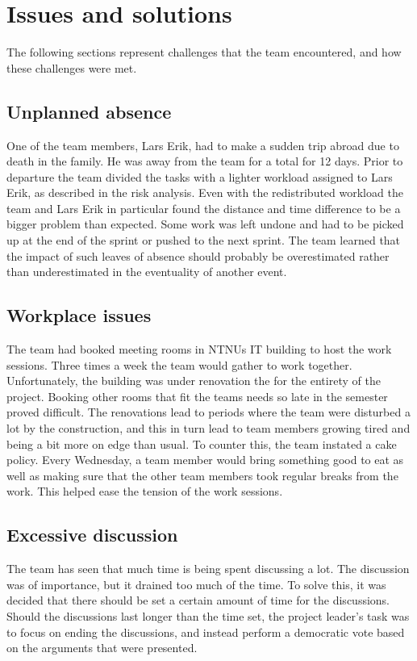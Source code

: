 \section{Issues and solutions}
The following sections represent challenges that the team encountered, and how these challenges were met.

\subsection{Unplanned absence}
One of the team members, Lars Erik, had to make a sudden trip abroad due to
death in the family. He was away from the team for a total for 12 days. Prior
to departure the team divided the tasks with a lighter workload assigned to Lars
Erik, as described in the risk analysis. Even with the redistributed workload
the team and Lars Erik in particular found the distance and time difference to
be a bigger problem than expected. Some work was left undone and had to be
picked up at the end of the sprint or pushed to the next sprint. The team
learned that the impact of such leaves of absence should probably be
overestimated rather than underestimated in the eventuality of another event.

\subsection{Workplace issues}
The team had booked meeting rooms in NTNUs IT building to host the work sessions. Three times a week the team would gather to work together. Unfortunately, the building was under renovation the for the entirety of the project. Booking other rooms that fit the teams needs so late in the semester proved difficult. The renovations lead to periods where the team were disturbed a lot by the construction, and this in turn lead to team members growing tired and being a bit more on edge than usual. To counter this, the team instated a cake policy. Every Wednesday, a team member would bring something good to eat as well as making sure that the other team members took regular breaks from the work. This helped ease the tension of the work sessions.


\subsection{Excessive discussion}
The team has seen that much time is being spent discussing a lot. The discussion was of importance, but it drained too much of the time. To solve this, it was decided that there should be set a certain amount of time for the discussions. Should the discussions last longer than the time set, the project leader's task was to focus on ending the discussions, and instead perform a democratic vote based on the arguments that were presented. 

